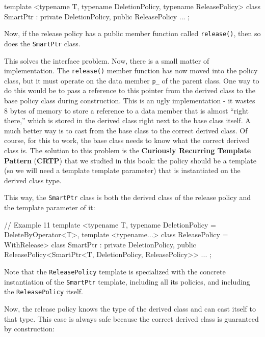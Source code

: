 \begin{code}
template <typename T,
          typename DeletionPolicy,
          typename ReleasePolicy>
class SmartPtr : private DeletionPolicy,
                 public ReleasePolicy {
  ...
};
\end{code}

Now, if the release policy has a public member function called \texttt{release()}, then so does the \texttt{SmartPtr} class.

This solves the interface problem. Now, there is a small matter of implementation. The \texttt{release()} member function has now moved into the policy class, but it must operate on the data member \texttt{p\_} of the parent class. One way to do this would be to pass a reference to this pointer from the derived class to the base policy class during construction. This is an ugly implementation - it wastes 8 bytes of memory to store a reference to a data member that is almost ``right there,'' which is stored in the derived class right next to the base class itself. A much better way is to cast from the base class to the correct derived class. Of course, for this to work, the base class needs to know what the correct derived class is. The solution to this problem is the \textbf{Curiously Recurring Template Pattern} (\textbf{CRTP}) that we studied in this book: the policy should be a template (so we will need a template template parameter) that is instantiated on the derived class type.

This way, the \texttt{SmartPtr} class is both the derived class of the release policy and the template parameter of it:

\begin{code}
// Example 11
template <typename T,
          typename DeletionPolicy = DeleteByOperator<T>,
          template <typename...> class ReleasePolicy =
                                       WithRelease>
class SmartPtr : private DeletionPolicy,
                 public ReleasePolicy<SmartPtr<T,
                          DeletionPolicy, ReleasePolicy>>
{ ... };
\end{code}

Note that the \texttt{ReleasePolicy} template is specialized with the concrete instantiation of the \texttt{SmartPtr} template, including all its policies, and including the \texttt{ReleasePolicy} itself.

Now, the release policy knows the type of the derived class and can cast itself to that type. This case is always safe because the correct derived class is guaranteed by construction:

